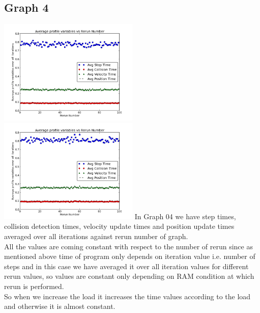 \documentclass[11pt]{article}
\begin{document}
\subsection{Graph 4}
 \includegraphics[width=0.5\textwidth,keepaspectratio]{img/g08_plot03_low} \includegraphics[width=0.5\textwidth,keepaspectratio]{img/g08_plot03_high}
In Graph 04 we have step times, collision detection times, velocity update times and position update times averaged over all iterations against rerun number of graph.\\
All the values are coming constant with respect to the number of rerun since as mentioned above time of program only depends on iteration value i.e. number of steps and in this case we have averaged it over all iteration values for different rerun values, so values are constant only depending on RAM condition at which rerun is performed.\\
So when we increase the load it increases the time values according to the load and otherwise it is almost constant.\\
\end{document}
